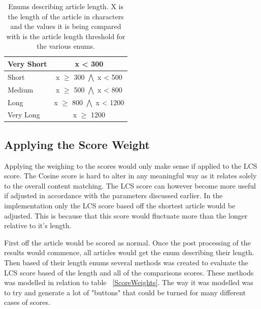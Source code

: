 \begin{table}
\begin{center}
	\begin{tabular}{l | c}
	Very Short & x < 300\\ \hline
	Short & x $\geq$ 300 $\bigwedge$ x < 500\\ \hline
	Medium & x $\geq$ 500 $\bigwedge$ x < 800\\ \hline
	Long & x $\geq$ 800 $\bigwedge$ x < 1200\\ \hline
	Very Long & x $\geq$ 1200\\ \hline
	\end{tabular}
\end{center}
\caption{Enums describing article length. X is the length of the article in characters and the values it is being compared with is the article length threshold for the various enums.}
	\label{enums}
\end{table}

\subsection{Applying the Score Weight}
Applying the weighing to the scores would only make sense if applied to the LCS score. The Cosine score is hard to alter in any meaningful way as it relates solely to the overall content matching. The LCS score can however become more useful if adjusted in accordance with the parameters discussed earlier. In the implementation only the LCS score based off the shortest article would be adjusted. This is because that this score would fluctuate more than the longer relative to it's length.

First off the article would be scored as normal. Once the post processing of the results would commence, all articles would get the enum describing their length. Then based of their length enums several methods was created to evaluate the LCS score based of the length and all of the comparisons scores. These methods was modelled in relation to table ~\ref{ScoreWeights}. The way it was modelled was to try and generate a lot of "buttons" that could be turned for many different cases of scores.

